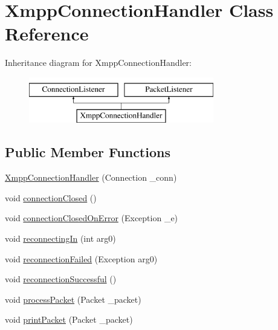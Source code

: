 \hypertarget{class_xmpp_connection_handler}{\section{Xmpp\-Connection\-Handler Class Reference}
\label{class_xmpp_connection_handler}
}
Inheritance diagram for Xmpp\-Connection\-Handler\-:\begin{figure}[H]
\begin{center}
\leavevmode
\includegraphics[height=2.000000cm]{class_xmpp_connection_handler}
\end{center}
\end{figure}
\subsection*{Public Member Functions}
\begin{DoxyCompactItemize}
\item 
\hyperlink{class_xmpp_connection_handler_a8134b389d59cc31444444e6ae06108d1}{Xmpp\-Connection\-Handler} (Connection \-\_\-conn)
\item 
void \hyperlink{class_xmpp_connection_handler_aeb67398c439c320dc1735ea12e0b1c05}{connection\-Closed} ()
\item 
void \hyperlink{class_xmpp_connection_handler_a08bebcf8a9f0ccc01b7283270af7eb85}{connection\-Closed\-On\-Error} (Exception \-\_\-e)
\item 
void \hyperlink{class_xmpp_connection_handler_ac275df15eae55d5f5b24ed1b3369a795}{reconnecting\-In} (int arg0)
\item 
void \hyperlink{class_xmpp_connection_handler_a115d9aa0c61e087e3ebecd41af5c2ab3}{reconnection\-Failed} (Exception arg0)
\item 
void \hyperlink{class_xmpp_connection_handler_a98227c5f7552aeec92bd992bc672a85d}{reconnection\-Successful} ()
\item 
void \hyperlink{class_xmpp_connection_handler_a44e816034459da4296e083a92b00a4ec}{process\-Packet} (Packet \-\_\-packet)
\item 
void \hyperlink{class_xmpp_connection_handler_aad2801f3a2b128e9ff9194e35db9cdd2}{print\-Packet} (Packet \-\_\-packet)
\end{DoxyCompactItemize}


